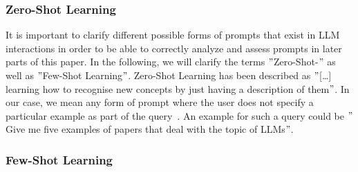 \subsubsection{Zero-Shot Learning} %
It is important to clarify different possible forms of prompts that exist in LLM interactions in order
to be able to correctly analyze and assess prompts in later parts of this paper.
In the following, we will clarify the terms \("\)Zero-Shot-\("\) as well as \("\)Few-Shot Learning\("\).
Zero-Shot Learning has been described as \("\)[\ldots] learning how to recognise
new concepts by just having a description of them\("\)\cite[p. 1]{feris_embarrassingly_2015}.
In our case, we mean any form of prompt where the user does not specify a particular example as
part of the query~\cite[p. 1]{dang_how_2022}.
An example for such a query could be \("\)Give me five examples of papers that deal with the topic
of LLMs\("\).

\subsubsection{Few-Shot Learning}
